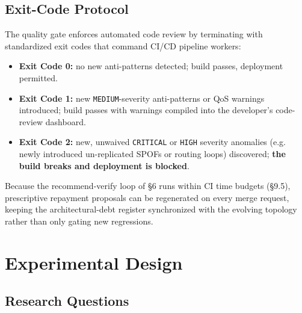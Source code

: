 \documentclass[11pt]{article}
\begin{document}
\subsection{Exit-Code Protocol}

The quality gate enforces automated code review by terminating with standardized exit codes that
command CI/CD pipeline workers:

\begin{itemize}
\item \textbf{Exit Code 0:} no new anti-patterns detected; build passes, deployment permitted.
\item \textbf{Exit Code 1:} new \texttt{MEDIUM}-severity anti-patterns or QoS warnings introduced;
  build passes with warnings compiled into the developer's code-review dashboard.
\item \textbf{Exit Code 2:} new, unwaived \texttt{CRITICAL} or \texttt{HIGH} severity anomalies (e.g.
  newly introduced un-replicated SPOFs or routing loops) discovered; \textbf{the build breaks and
  deployment is blocked}.
\end{itemize}

Because the recommend-verify loop of \S6 runs within CI time budgets (\S9.5), prescriptive repayment
proposals can be regenerated on every merge request, keeping the architectural-debt register
synchronized with the evolving topology rather than only gating new regressions.

\section{Experimental Design}

\subsection{Research Questions}
\end{document}

